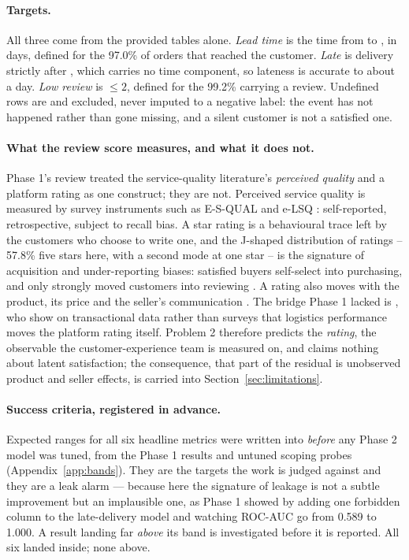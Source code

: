 \paragraph{Targets.} All three come from the provided tables alone.
\emph{Lead time} is the time from  to
, in days, defined for the 97.0\% of
orders that reached the customer. \emph{Late} is delivery strictly after
, which carries no time component, so
lateness is accurate to about a day. \emph{Low review} is 
$\le 2$, defined for the 99.2\% carrying a review. Undefined rows are 
and excluded, never imputed to a negative label: the event has not happened
rather than gone missing, and a silent customer is not a satisfied one.

\paragraph{What the review score measures, and what it does not.}
Phase 1's review treated the service-quality literature's \emph{perceived
quality} and a platform rating as one construct; they are not. Perceived
service quality is measured by survey instruments such as E-S-QUAL
\citep{parasuraman2005esqual} and e-LSQ \citep{rao2011elsq}: self-reported,
retrospective, subject to recall bias. A star rating is a behavioural trace
left by the customers who choose to write one, and the J-shaped distribution of
ratings -- 57.8\% five stars here, with a second mode at one star -- is the
signature of acquisition and under-reporting biases: satisfied buyers
self-select into purchasing, and only strongly moved customers into reviewing
\citep{hu2009jshaped, hu2017selfselection}. A rating also moves with the
product, its price and the seller's communication
\citep{dellarocas2003digitization}. The bridge Phase 1 lacked is
\citet{deshpande2023logistics}, who show on transactional data rather than
surveys that logistics performance moves the platform rating itself. Problem 2
therefore predicts the \emph{rating}, the observable the customer-experience
team is measured on, and claims nothing about latent satisfaction; the
consequence, that part of the residual is unobserved product and seller
effects, is carried into Section~\ref{sec:limitations}.

\paragraph{Success criteria, registered in advance.}
Expected ranges for all six headline metrics were written into
 \emph{before} any Phase 2 model was tuned, from the
Phase 1 results and untuned scoping probes (Appendix~\ref{app:bands}). They are
the targets the work is judged against and they are a leak alarm --- because here
the signature of leakage is not a subtle improvement but an implausible one, as
Phase 1 showed by adding one forbidden column to the late-delivery model and
watching ROC-AUC go from 0.589 to 1.000. A result landing far \emph{above} its
band is investigated before it is reported. All six landed inside; none above.

